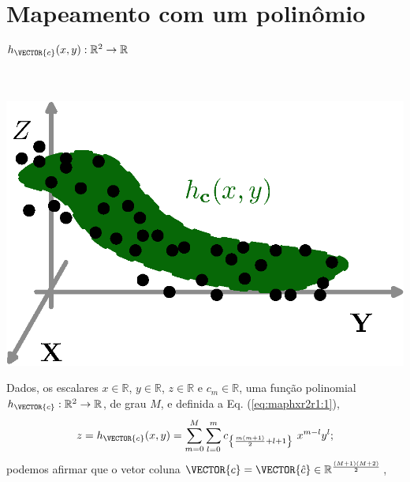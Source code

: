 \section{Mapeamento com um polinômio $h_{\VECTOR{c}}(x,y):\mathbb{R}^2 \rightarrow \mathbb{R}$}

\begin{theorem}
\label{theo:maphxr2r1}
~\\
\begin{minipage}{0.4\textwidth}
\centering
\includegraphics[width=0.95\linewidth]{chapters/mapeamento/mapeamento-hx2.eps} 
\end{minipage}
\begin{minipage}{0.6\textwidth}
Dados,
os escalares $x \in \mathbb{R}$, $y \in \mathbb{R}$, $z \in \mathbb{R}$ e $c_m \in \mathbb{R}$,
uma função polinomial $h_{\VECTOR{c}}:\mathbb{R}^2 \rightarrow \mathbb{R}$, de grau $M$, e 
definida a Eq. (\ref{eq:maphxr2r1:1}),
\begin{equation}\label{eq:maphxr2r1:1}
z= h_{\VECTOR{c}}(x,y) = \sum \limits_{m=0}^{M} \sum \limits_{l=0}^{m}c_{\left\{ \frac{m(m+1)}{2}+l+1\right\}}~x^{m-l}y^{l}; 
\end{equation}
podemos afirmar que o vetor coluna $\VECTOR{c}=\VECTOR{\hat{c}} \in \mathbb{R}^{\frac{(M+1)(M+2)}{2}}$,

\end{minipage}
\end{theorem}
